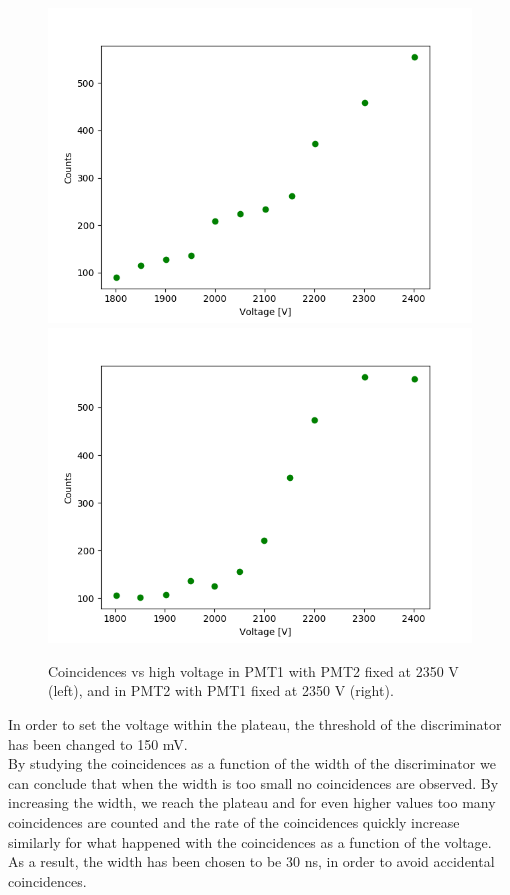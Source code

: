 \documentclass[10pt,swedish, openany]{book}
\begin{document}
\begin{figure}[H]
\includegraphics[scale=0.5]{CoincidencePMT1.png}
\includegraphics[scale=0.5]{CoincidencePMT2.png}
\centering
\caption{Coincidences vs high voltage in PMT1 with PMT2 fixed at 2350 V (left), and in PMT2 with PMT1 fixed at 2350 V (right).}
\label{fig:coincidence}
\end{figure}

In order to set the voltage within the plateau, the threshold of the discriminator has been changed to 150 mV.\\

By studying the coincidences as a function of the width of the discriminator we can conclude that when the width is too small no coincidences are observed. By increasing the width, we reach the plateau and for even higher values too many coincidences are counted and the rate of the coincidences quickly increase similarly for what happened with the coincidences as a function of the voltage. As a result, the width has been chosen to be 30 ns, in order to avoid accidental coincidences.\\
\end{document}
